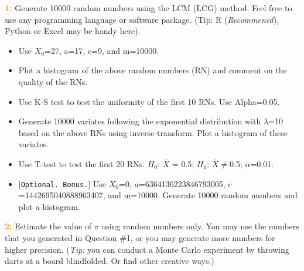 \documentclass{article}
\begin{document}
%
%
%
%
\textcolor{orange}{\bf 1:} Generate 10000 random numbers using the LCM (LCG) method. Feel free to use any programming language or software package. (Tip: R (\emph{Recommened}), Python or Excel may be handy here).
\begin{itemize}
\item Use $X_0$=27, a=17, c=9, and m=10000. 
\item  Plot a histogram of the above random numbers (RN) and comment on the quality of the RNs. 
\item  Use K-S test to test the uniformity of the first 10 RNs. Use Alpha=0.05. 
\item Generate 10000 variates following the exponential distribution with $\lambda$=10 based on the above RNs using inverse-transform. Plot a histogram of these variates.
\item  Use T-test to test the first 20 RNs. $H_0$: $\bar{X}$ = 0.5; $H_1$: $\bar{X} \neq$0.5; $\alpha$=0.01. 
\item {[\texttt{Optional. Bonus.}]} Use $X_0$=0, $a$=6364136223846793005, $c$=1442695040888963407, and m=10000. Generate 10000 random numbers and plot a histogram. 
\end{itemize}

\vskip 0.1in 

\textcolor{orange}{\bf 2:} Estimate the value of $\pi$ using random numbers only.  You may use the numbers that you generated in Question \#1, or you may generate more numbers for higher precision. (\textit{Tip:} you can conduct a Monte Carlo experiment by throwing darts at a board blindfolded. Or find other creative ways.)
\end{document}
